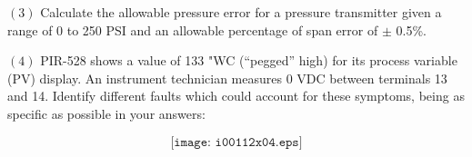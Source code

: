 \vskip 20pt

\item{$(3)$} Calculate the allowable pressure error for a pressure transmitter given a range of 0 to 250 PSI and an allowable percentage of span error of $\pm$ 0.5\%.

\vskip 20pt

\item{$(4)$} PIR-528 shows a value of 133 "WC (``pegged'' high) for its process variable (PV) display.  An instrument technician measures 0 VDC between terminals 13 and 14.  Identify  different faults which could account for these symptoms, being as specific as possible in your answers:

$$\texttt{[image: i00112x04.eps]}$$






